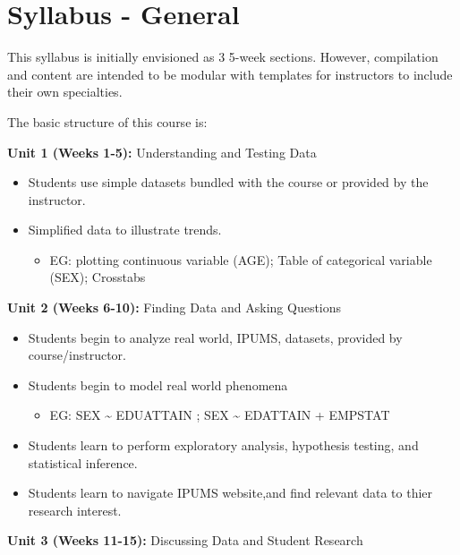 \documentclass[
]{book}
\providecommand{\tightlist}{%
  \setlength{\itemsep}{0pt}\setlength{\parskip}{0pt}}
\begin{document}
\hypertarget{syllabus---general}{%
\section*{Syllabus - General}\label{syllabus---general}}

This syllabus is initially envisioned as 3 5-week sections. However, compilation and content are intended to be modular with templates for instructors to include their own specialties.

The basic structure of this course is:

\textbf{Unit 1 (Weeks 1-5):} Understanding and Testing Data

\begin{itemize}
\tightlist
\item
  Students use simple datasets bundled with the course or provided by the instructor.
\item
  Simplified data to illustrate trends.

  \begin{itemize}
  \tightlist
  \item
    EG: plotting continuous variable (AGE); Table of categorical variable (SEX); Crosstabs
  \end{itemize}
\end{itemize}

\textbf{Unit 2 (Weeks 6-10):} Finding Data and Asking Questions

\begin{itemize}
\tightlist
\item
  Students begin to analyze real world, IPUMS, datasets, provided by course/instructor.
\item
  Students begin to model real world phenomena

  \begin{itemize}
  \tightlist
  \item
    EG: SEX \textasciitilde{} EDUATTAIN ; SEX \textasciitilde{} EDATTAIN + EMPSTAT
  \end{itemize}
\item
  Students learn to perform exploratory analysis, hypothesis testing, and statistical inference.
\item
  Students learn to navigate IPUMS website,and find relevant data to thier research interest.
\end{itemize}

\textbf{Unit 3 (Weeks 11-15):} Discussing Data and Student Research
\end{document}
